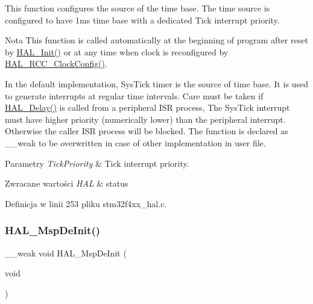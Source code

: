 This function configures the source of the time base. The time source is configured to have 1ms time base with a dedicated Tick interrupt priority. 

\begin{DoxyNote}{Nota}
This function is called automatically at the beginning of program after reset by \hyperlink{group___h_a_l___exported___functions___group1_gaecac54d350c3730e6831eb404e557dc4}{H\+A\+L\+\_\+\+Init()} or at any time when clock is reconfigured by \hyperlink{group___r_c_c___exported___functions___group1_gad0a4b5c7459219fafc15f3f867563ef3}{H\+A\+L\+\_\+\+R\+C\+C\+\_\+\+Clock\+Config()}. 

In the default implementation, Sys\+Tick timer is the source of time base. It is used to generate interrupts at regular time intervals. Care must be taken if \hyperlink{group___h_a_l___exported___functions___group2_gab1dc1e6b438daacfe38a312a90221330}{H\+A\+L\+\_\+\+Delay()} is called from a peripheral I\+SR process, The Sys\+Tick interrupt must have higher priority (numerically lower) than the peripheral interrupt. Otherwise the caller I\+SR process will be blocked. The function is declared as \+\_\+\+\_\+weak to be overwritten in case of other implementation in user file. 
\end{DoxyNote}

\begin{DoxyParams}{Parametry}
{\em Tick\+Priority} & Tick interrupt priority. \\
\hline
\end{DoxyParams}

\begin{DoxyRetVals}{Zwracane wartości}
{\em H\+AL} & status \\
\hline
\end{DoxyRetVals}


Definicja w linii 253 pliku stm32f4xx\+\_\+hal.\+c.

\mbox{\label{group___h_a_l___exported___functions___group1_gaa2d4540edcb9dacec34edb77f3455bf0}} 
\subsubsection{\texorpdfstring{H\+A\+L\+\_\+\+Msp\+De\+Init()}{HAL\_MspDeInit()}}
{\footnotesize\ttfamily \+\_\+\+\_\+weak void H\+A\+L\+\_\+\+Msp\+De\+Init (\begin{DoxyParamCaption}\item[{void}]{ }\end{DoxyParamCaption})}



